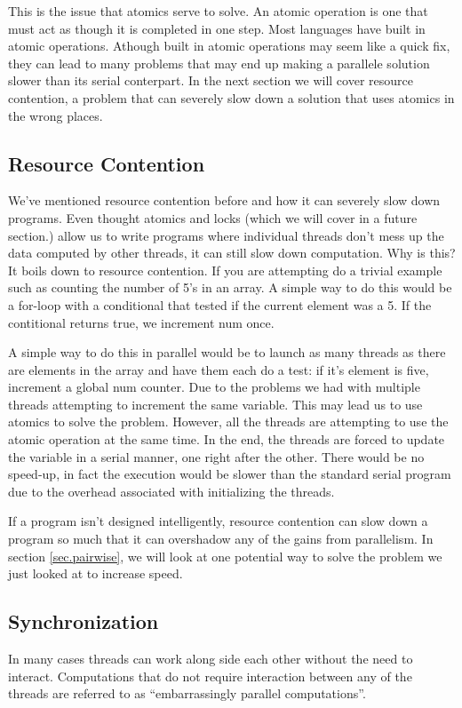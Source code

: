 \documentclass{article}
\newcommand{\comp}[1]{{\ttfamily #1}}
\begin{document}
    This is the issue that atomics serve to solve. An atomic operation is one that must act as though it is completed in one step. Most languages have built in atomic operations. Athough built in atomic operations may seem like a quick fix, they can lead to many problems that may end up making a parallele solution slower than its serial conterpart. In the next section we will cover resource contention, a problem that can severely slow down a solution that uses atomics in the wrong places.
    	
    \subsection{Resource Contention}
    \label{sec.rescont}    
    We've mentioned resource contention  before and how it can severely slow down programs. Even thought atomics and locks (which we will cover in a future section.) allow us to write programs where individual threads don't mess up the data computed by other threads, it can still slow down computation. Why is this? It boils down to resource contention. If you are attempting do a trivial example such as counting the number of 5's in an array. A simple way to do this would be a for-loop with a conditional that tested if the current element was a 5. If the contitional returns \comp{true}, we increment \comp{num} once.

    A simple way to do this in parallel would be to launch as many threads as there are elements in the array and have them each do a test: if it's element is five, increment a global \comp{num} counter. Due to the problems we had with multiple threads attempting to increment the same variable. This may lead us to use atomics to solve the problem. However, all the threads are attempting to use the atomic operation at the same time. In the end, the threads are forced to update the variable in a serial manner, one right after the other. There would be no speed-up, in fact the execution would be slower than the standard serial program due to the overhead associated with initializing the threads.
	
    If a program isn't designed intelligently, resource contention can slow down a program so much that it can overshadow any of the gains from parallelism. In section \ref{sec.pairwise}, we will look at one potential way to solve the problem we just looked at to increase speed.
	
	 \subsection{Synchronization}
    In many cases threads can work along side each other without the need to interact. Computations that do not require interaction between any of the threads are referred to as ``embarrassingly parallel computations''.
\end{document}
